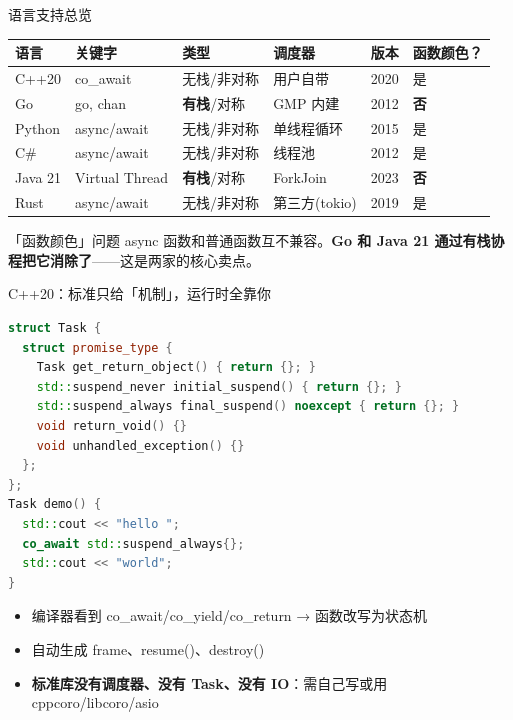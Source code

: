 \documentclass[aspectratio=169, 10pt]{beamer}
\begin{document}
\begin{frame}{语言支持总览}
  \centering
  \small
  \begin{tabular}{llllll}
    \toprule
    \textbf{语言} & \textbf{关键字} & \textbf{类型} & \textbf{调度器} & \textbf{版本} & \textbf{函数颜色？} \\
    \midrule
    C++20 & co\_await & 无栈/非对称 & 用户自带 & 2020 & 是 \\
    Go & go, chan & \textbf{有栈}/对称 & GMP 内建 & 2012 & \textbf{否} \\
    Python & async/await & 无栈/非对称 & 单线程循环 & 2015 & 是 \\
    C\# & async/await & 无栈/非对称 & 线程池 & 2012 & 是 \\
    Java 21 & Virtual Thread & \textbf{有栈}/对称 & ForkJoin & 2023 & \textbf{否} \\
    Rust & async/await & 无栈/非对称 & 第三方(tokio) & 2019 & 是 \\
    \bottomrule
  \end{tabular}

  \vspace{0.3cm}
  \begin{alertblock}{「函数颜色」问题}
    async 函数和普通函数互不兼容。\textbf{Go 和 Java 21 通过有栈协程把它消除了}——这是两家的核心卖点。
  \end{alertblock}
\end{frame}

\begin{frame}[fragile]{C++20：标准只给「机制」，运行时全靠你}
  \begin{lstlisting}[language=C++, title={C++20 协程最小示例}]
struct Task {
  struct promise_type {
    Task get_return_object() { return {}; }
    std::suspend_never initial_suspend() { return {}; }
    std::suspend_always final_suspend() noexcept { return {}; }
    void return_void() {}
    void unhandled_exception() {}
  };
};
Task demo() {
  std::cout << "hello ";
  co_await std::suspend_always{};
  std::cout << "world";
}
  \end{lstlisting}

  \begin{itemize}
    \item 编译器看到 co\_await/co\_yield/co\_return → 函数改写为状态机
    \item 自动生成 frame、resume()、destroy()
    \item \textbf{标准库没有调度器、没有 Task、没有 IO}：需自己写或用 cppcoro/libcoro/asio
  \end{itemize}
\end{frame}
\end{document}
